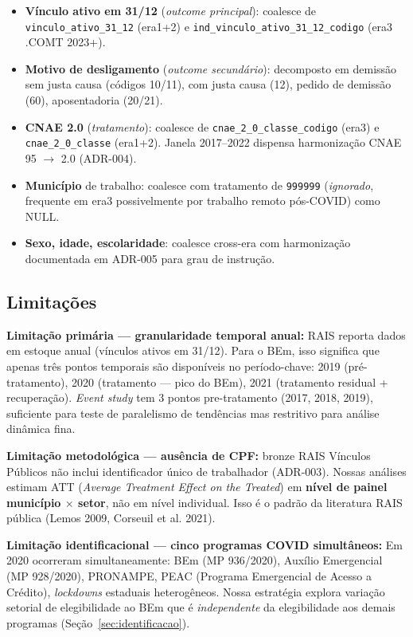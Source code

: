 \documentclass[12pt,a4paper,oneside]{article}
\begin{document}
\begin{itemize}
  \item \textbf{Vínculo ativo em 31/12} (\textit{outcome principal}):
        coalesce de \texttt{vinculo\_ativo\_31\_12} (era1+2) e
        \texttt{ind\_vinculo\_ativo\_31\_12\_codigo} (era3 .COMT 2023+).
  \item \textbf{Motivo de desligamento} (\textit{outcome secundário}):
        decomposto em demissão sem justa causa (códigos 10/11), com
        justa causa (12), pedido de demissão (60), aposentadoria (20/21).
  \item \textbf{CNAE 2.0} (\textit{tratamento}): coalesce de
        \texttt{cnae\_2\_0\_classe\_codigo} (era3) e
        \texttt{cnae\_2\_0\_classe} (era1+2). Janela 2017--2022 dispensa
        harmonização CNAE 95 $\to$ 2.0 (ADR-004).
  \item \textbf{Município} de trabalho: coalesce com tratamento de
        \texttt{999999} (\textit{ignorado}, frequente em era3 possivelmente
        por trabalho remoto pós-COVID) como NULL.
  \item \textbf{Sexo, idade, escolaridade}: coalesce cross-era com
        harmonização documentada em ADR-005 para grau de instrução.
\end{itemize}

\subsection{Limitações}

\textbf{Limitação primária --- granularidade temporal anual:}
RAIS reporta dados em estoque anual (vínculos ativos em 31/12). Para o
BEm, isso significa que apenas três pontos temporais são disponíveis no
período-chave: 2019 (pré-tratamento), 2020 (tratamento --- pico do BEm),
2021 (tratamento residual + recuperação). \textit{Event study} tem 3
pontos pre-tratamento (2017, 2018, 2019), suficiente para teste de
paralelismo de tendências mas restritivo para análise dinâmica fina.

\textbf{Limitação metodológica --- ausência de CPF:} bronze RAIS Vínculos
Públicos não inclui identificador único de trabalhador (ADR-003). Nossas
análises estimam ATT (\textit{Average Treatment Effect on the Treated})
em \textbf{nível de painel município $\times$ setor}, não em nível
individual. Isso é o padrão da literatura RAIS pública (Lemos 2009,
Corseuil et al. 2021).

\textbf{Limitação identificacional --- cinco programas COVID
simultâneos:} Em 2020 ocorreram simultaneamente: BEm (MP 936/2020),
Auxílio Emergencial (MP 928/2020), PRONAMPE, PEAC (Programa Emergencial
de Acesso a Crédito), \textit{lockdowns} estaduais heterogêneos. Nossa
estratégia explora variação setorial de elegibilidade ao BEm que é
\textit{independente} da elegibilidade aos demais programas
(Seção~\ref{sec:identificacao}).
\end{document}
